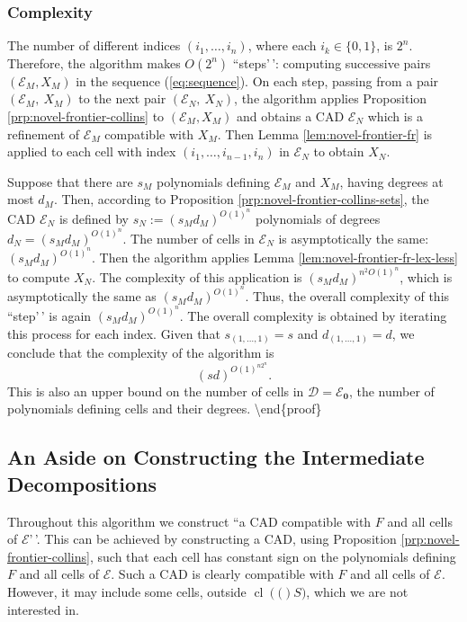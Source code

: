 \documentclass[
]{book}
\theoremstyle{definition}
\theoremstyle{definition}
\theoremstyle{definition}
\theoremstyle{definition}
\theoremstyle{remark}
\begin{document}
\hypertarget{complexity}{%
\subsubsection{Complexity}\label{complexity}}

The number of different indices \((i_1, \ldots, i_n)\), where each \(i_k \in \{ 0,1 \}\), is \(2^n\).
Therefore, the algorithm makes \(O(2^n)\) ``steps'\,': computing successive pairs \(({\mathcal E}_M, X_M)\) in the sequence (\ref{eq:sequence}).
On each step, passing from a pair \((\mathcal{E}_M,\ X_M)\) to the next pair \((\mathcal{E}_N,\ X_N)\), the algorithm applies Proposition \ref{prp:novel-frontier-collins} to \(({\mathcal E}_M, X_M)\) and obtains a CAD
\({\mathcal E}_N\) which is a refinement of \({\mathcal E}_M\) compatible with \(X_M\).
Then Lemma \ref{lem:novel-frontier-fr} is applied to each cell with index \((i_1,\ldots,i_{n-1},i_n)\) in \({\mathcal E}_N\)
to obtain \(X_N\).

Suppose that there are \(s_M\) polynomials defining \({\mathcal E}_M\) and \(X_M\), having degrees at most \(d_M\).
Then, according to Proposition \ref{prp:novel-frontier-collins-sets}, the CAD \({\mathcal E}_N\) is defined by
\(s_N:=(s_Md_M)^{O(1)^n}\) polynomials of degrees \(d_N=(s_Md_M)^{O(1)^n}\).
The number of cells in \({\mathcal E}_N\) is asymptotically the same: \((s_Md_M)^{O(1)^n}\).
Then the algorithm applies Lemma \ref{lem:novel-frontier-fr-lex-less} to compute \(X_N\).
The complexity of this application is \((s_Md_M)^{n^2O(1)^n}\), which is asymptotically the same as \((s_Md_M)^{O(1)^n}\).
Thus, the overall complexity of this ``step'\,' is again \((s_Md_M)^{O(1)^n}\). The overall complexity is obtained by iterating this process for each index.
Given that \(s_{(1, \ldots,1)}=s\) and \(d_{(1, \ldots,1)}=d\), we conclude that
the complexity of the algorithm is
\[
(sd)^{O(1)^{n2^n}}.
\]
This is also an upper bound on the number of cells in \(\mathcal D={\mathcal E}_{\mathbf{0}}\), the number of polynomials defining cells and their degrees.
\textbackslash end\{proof\}

\hypertarget{an-aside-on-constructing-the-intermediate-decompositions}{%
\subsection{An Aside on Constructing the Intermediate Decompositions}\label{an-aside-on-constructing-the-intermediate-decompositions}}

Throughout this algorithm we construct ``a CAD compatible with \(F\) and all cells of \(\mathcal{E}\)'\,'.
This can be achieved by constructing a CAD, using Proposition \ref{prp:novel-frontier-collins}, such that each cell has constant sign on the polynomials defining \(F\) and all cells of \(\mathcal{E}\). Such a CAD is clearly compatible with \(F\) and all cells of \(\mathcal{E}\). However, it may include some cells, outside \({\operatorname{cl} \left( ( \right)}S)\), which we are not interested in.
\end{document}
